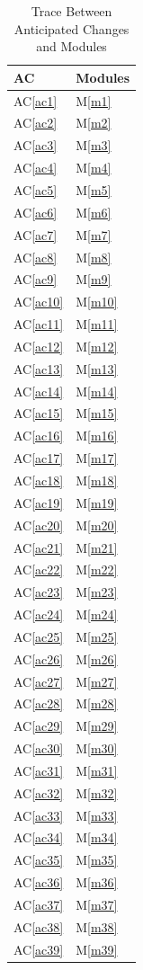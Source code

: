 \documentclass[12pt, titlepage]{article}
\newcommand{\acref}[1]{AC\ref{#1}}
\newcommand{\mref}[1]{M\ref{#1}}
\begin{document}
	\begin{longtable}{p{} p{}}
		\caption{Trace Between Anticipated Changes and Modules}
		\label{TblACT}\\
		\toprule
		\textbf{AC} & \textbf{Modules}\\
		\midrule
		\acref{ac1} & \mref{m1}\\
		\acref{ac2} & \mref{m2}\\
		\acref{ac3} & \mref{m3}\\
		\acref{ac4} & \mref{m4}\\
		\acref{ac5} & \mref{m5}\\
		\acref{ac6} & \mref{m6}\\
		\acref{ac7} & \mref{m7}\\
		\acref{ac8} & \mref{m8}\\
		\acref{ac9} & \mref{m9}\\
		\acref{ac10} & \mref{m10}\\
		\acref{ac11} & \mref{m11}\\
		\acref{ac12} & \mref{m12}\\
		\acref{ac13} & \mref{m13}\\
		\acref{ac14} & \mref{m14}\\
		\acref{ac15} & \mref{m15}\\
		\acref{ac16} & \mref{m16}\\
		\acref{ac17} & \mref{m17}\\
		\acref{ac18} & \mref{m18}\\
		\acref{ac19} & \mref{m19}\\
		\acref{ac20} & \mref{m20}\\
		\acref{ac21} & \mref{m21}\\
		\acref{ac22} & \mref{m22}\\
		\acref{ac23} & \mref{m23}\\
		\acref{ac24} & \mref{m24}\\
		\acref{ac25} & \mref{m25}\\
		\acref{ac26} & \mref{m26}\\
		\acref{ac27} & \mref{m27}\\
		\acref{ac28} & \mref{m28}\\
		\acref{ac29} & \mref{m29}\\
		\acref{ac30} & \mref{m30}\\
		\acref{ac31} & \mref{m31}\\
		\acref{ac32} & \mref{m32}\\
		\acref{ac33} & \mref{m33}\\
		\acref{ac34} & \mref{m34}\\
		\acref{ac35} & \mref{m35}\\
		\acref{ac36} & \mref{m36}\\
		\acref{ac37} & \mref{m37}\\
		\acref{ac38} & \mref{m38}\\
		\acref{ac39} & \mref{m39}\\
		
		\bottomrule
	\end{longtable}
\end{document}
